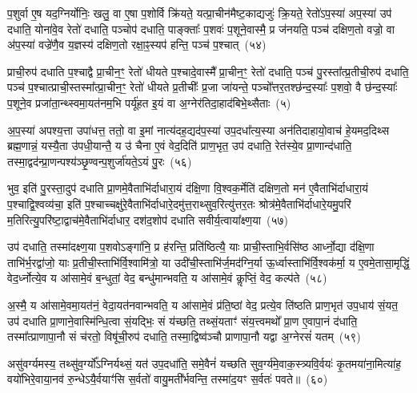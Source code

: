 प॒शुर्वा ए॒ष यद॒ग्निर्योनिः॒ खलु॒ वा ए॒षा प॒शोर्वि क्रि॑यते॒ यत्प्रा॒चीन॑मैष्ट॒काद्यजुः॑ क्रि॒यते॒ रेतो॑\-ऽप॒स्या॑ अप॒स्या॑ उप॑ दधाति॒ योना॑वे॒व रेतो॑ दधाति॒ पञ्चोप॑ दधाति॒ पाङ्क्ताः᳚ प॒शवः॑ प॒शूने॒वास्मै॒ प्र ज॑नयति॒ पञ्च॑ दक्षिण॒तो वज्रो॒ वा अ॑प॒स्या॑ वज्रे॑णै॒व य॒ज्ञस्य॑ दक्षिण॒तो रक्षा॒ꣴ॒स्यप॑ हन्ति॒ पञ्च॑ प॒श्चात्~(५४)

प्राची॒रुप॑ दधाति प॒श्चाद्वै प्रा॒चीन॒ꣳ॒ रेतो॑ धीयते प॒श्चादे॒वास्मै᳚ प्रा॒चीन॒ꣳ॒ रेतो॑ दधाति॒ पञ्च॑ पु॒रस्ता᳚त्प्र॒तीची॒रुप॑ दधाति॒ पञ्च॑ प॒श्चात्प्राची॒स्तस्मा᳚त्प्रा॒चीन॒ꣳ॒ रेतो॑ धीयते प्र॒तीचीः᳚ प्र॒जा जा॑यन्ते॒ पञ्चो᳚त्तर॒तश्छ॑न्द॒स्याः᳚ प॒शवो॒ वै छ॑न्द॒स्याः᳚ प॒शूने॒व प्रजा॑ता॒न्थ्स्वमा॒यत॑नम॒भि पर्यू॑हत इ॒यं वा अ॒ग्नेर॑तिदा॒हाद॑बिभे॒थ्सैताः~(५)

अ॒प॒स्या॑ अपश्य॒त्ता उपा॑धत्त॒ ततो॒ वा इ॒मां नात्य॑दह॒द्यद॑प॒स्या॑ उप॒दधा᳚त्य॒स्या अन॑तिदाहायो॒वाच॑ हे॒यमद॒दिथ्स ब्रह्म॒णान्नं॒ यस्यै॒ता उ॑पधी॒यान्तै॒ य उ॑ चैना ए॒वं वेद॒दिति॑ प्राण॒भृत॒ उप॑ दधाति॒ रेत॑स्ये॒व प्रा॒णान्द॑धाति॒ तस्मा॒द्वद॑न्प्रा॒णन्पश्य॑ञ्छृ॒ण्वन्प॒शुर्जा॑यते॒\-ऽयं पु॒रः~(५६)

भुव॒ इति॑ पु॒रस्ता॒दुप॑ दधाति प्रा॒णमे॒वैताभि॑र्दाधारा॒यं द॑क्षि॒णा वि॒श्वक॒र्मेति॑ दक्षिण॒तो मन॑ ए॒वैताभि॑र्दाधारा॒यं प॒श्चाद्वि॒श्वव्य॑चा॒ इति॑ प॒श्चाच्चक्षु॑रे॒वैताभि॑र्दाधारे॒दमु॑त्त॒राथ्सुव॒रित्यु॑त्तर॒तः श्रोत्र॑मे॒वैताभि॑र्दाधारे॒यमु॒परि॑ म॒तिरित्यु॒परि॑ष्टा॒द्वाच॑मे॒वैताभि॑र्दाधार॒ दश॑द॒शोप॑ दधाति सवीर्य॒त्वाया᳚क्ष्ण॒या~(५७)

उप॑ दधाति॒ तस्मा॑दक्ष्ण॒या प॒शवो\-ऽङ्गा॑नि॒ प्र ह॑रन्ति॒ प्रति॑ष्ठित्यै॒ याः प्राची॒स्ताभि॒र्वसि॑ष्ठ आर्ध्नो॒द्या द॑क्षि॒णा ताभि॑र्भ॒रद्वा॑जो॒ याः प्र॒तीची॒स्ताभि॑र्वि॒श्वामि॑त्रो॒ या उदी॑ची॒स्ताभि॑र्ज॒मद॑ग्नि॒र्या ऊ॒र्ध्वास्ताभि॑र्वि॒श्वक॑र्मा॒ य ए॒वमे॒तासा॒मृद्धिं॒ वेद॒र्ध्नोत्ये॒व य आ॑सामे॒वं ब॒न्धुतां॒ वेद॒ बन्धु॑मान्भवति॒ य आ॑सामे॒वं कॢप्तिं॒ वेद॒ कल्प॑ते~(५८)

अ॒स्मै॒ य आ॑सामे॒वमा॒यत॑नं॒ वेदा॒यत॑नवान्भवति॒ य आ॑सामे॒वं प्र॑ति॒ष्ठां वेद॒ प्रत्ये॒व ति॑ष्ठति प्राण॒भृत॑ उप॒धाय॑ सं॒यत॒ उप॑ दधाति प्रा॒णाने॒वास्मि॑न्धि॒त्वा सं॒यद्भिः॒ सं य॑च्छति॒ तथ्सं॒यताꣳ॑ संय॒त्त्वमथो᳚ प्रा॒ण ए॒वापा॒नं द॑धाति॒ तस्मा᳚त्प्राणापा॒नौ सं च॑रतो॒ विषू॑ची॒रुप॑ दधाति॒ तस्मा॒द्विष्व॑ञ्चौ प्राणापा॒नौ यद्वा अ॒ग्नेरसं॑ यतम्~(५९)

असु॑वर्ग्यमस्य॒ तथ्सु॑व॒र्ग्यो᳚\-ऽग्निर्यथ्सं॒ यत॑ उप॒दधा॑ति॒ समे॒वैनं॑ यच्छति सुव॒र्ग्य॑मे॒वाक॒स्त्र्यवि॒र्वयः॑ कृ॒तमया॑ना॒मित्या॑ह॒ वयो॑भिरे॒वाया॒नव॑ रु॒न्धे\-ऽयै॒र्वयाꣳ॑सि स॒र्वतो॑ वायु॒मती᳚र्भवन्ति॒ तस्मा॑द॒यꣳ स॒र्वतः॑ पवते॥~(६०)

